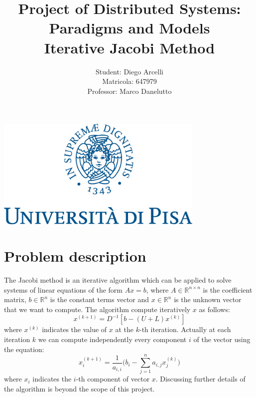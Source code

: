 \documentclass[12pt]{article}
\begin{document}
	
	\begin{titlepage}
		
		\title{Project of Distributed Systems: Paradigms and Models \\
		Iterative Jacobi Method}
		\author{Student: Diego Arcelli\\ Matricola: 647979 \\
			Professor: Marco  Danelutto}
		\maketitle
		\centering
		\includegraphics[width=10cm]{./images/unipi_logo.png}
		
	\end{titlepage}
	
	\tableofcontents
	\newpage
	
	\section{Problem description}
	The Jacobi method is an iterative algorithm which can be applied to solve systems of linear equations of the form $Ax = b$, where $A \in \mathbb{R}^{n\times n}$ is the coefficient matrix, $b \in \mathbb{R}^n$ is the constant terms vector and $x\in \mathbb{R}^n$ is the unknown vector that we want to compute. The algorithm compute iteratively $x$ as follows:
	\[ x^{(k+1)} =  D^{-1}[b-(U+L)x^{(k)}] \]
	where $x^{(k)}$ indicates the value of $x$ at the $k$-th iteration. Actually at each iteration $k$ we can compute independently every component $i$ of the vector using the equation:
	\begin{equation}
		\label{eqn:iteration}
		x^{(k+1)}_i = \frac{1}{a_{i,i}}\Big(b_i - \sum_{j=1}^n a_{i,j}x^{(k)}_j\Big)
	\end{equation}
	where $x_i$ indicates the $i$-th component of vector $x$. Discussing further details of the algorithm is beyond the scope of this project.
	
\end{document}
